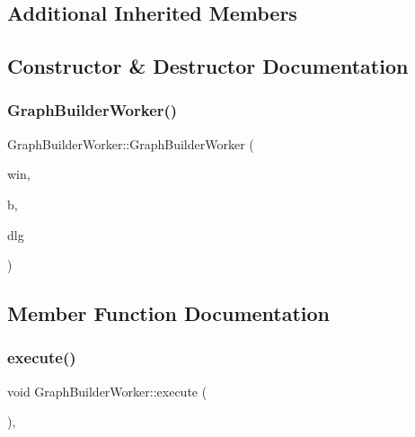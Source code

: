 \subsection*{Additional Inherited Members}


\subsection{Constructor \& Destructor Documentation}
\mbox{\label{class_graph_builder_worker_af47f0e2ca343b0a2b12ee212a09942d8}} 
\subsubsection{\texorpdfstring{GraphBuilderWorker()}{GraphBuilderWorker()}}
{\footnotesize\ttfamily Graph\+Builder\+Worker\+::\+Graph\+Builder\+Worker (\begin{DoxyParamCaption}\item[{\mbox{\hyperlink{class_main_window}{Main\+Window}} $\ast$}]{win,  }\item[{\mbox{\hyperlink{class_graph_builder}{Graph\+Builder}} $\ast$}]{b,  }\item[{\mbox{\hyperlink{class_wait_dialog}{Wait\+Dialog}} $\ast$}]{dlg }\end{DoxyParamCaption})}



\subsection{Member Function Documentation}
\mbox{\label{class_graph_builder_worker_a60151549187952017cad7da0f8a4749a}} 
\subsubsection{\texorpdfstring{execute()}{execute()}}
{\footnotesize\ttfamily void Graph\+Builder\+Worker\+::execute (\begin{DoxyParamCaption}{ }\end{DoxyParamCaption})\hspace{0.3cm}{\ttfamily [override]}, {\ttfamily [virtual]}}



